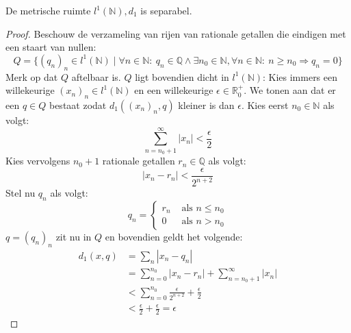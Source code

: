 \documentclass[main.tex]{subfiles}
\begin{document}
\begin{vb}
  De metrische ruimte $l^{1}(\mathbb{N}),d_{1}$ is separabel.
  
  \begin{proof}
    Beschouw de verzameling van rijen van rationale getallen die eindigen met een staart van nullen:\\
    \[ Q = \{ (q_{n})_{n} \in l^{1}(\mathbb{N}) \mid \forall n\in \mathbb{N}:\ q_{n}\in \mathbb{Q} \wedge \exists n_{0}\in \mathbb{N}, \forall n\in \mathbb{N}:\ n \ge n_{0} \Rightarrow q_{n} = 0 \} \]
    Merk op dat $Q$ aftelbaar is.
    $Q$ ligt bovendien dicht in $l^{1}(\mathbb{N})$:
    Kies immers een willekeurige $(x_{n})_{n}\in l^{1}(\mathbb{N})$ en een willekeurige $\epsilon \in \mathbb{R}_{0}^{+}$.
    We tonen aan dat er een $q\in Q$ bestaat zodat $d_{1}((x_{n})_{n},q)$ kleiner is dan $\epsilon$.
    Kies eerst $n_{0}\in \mathbb{N}$ als volgt:
    \[ \sum_{n=n_{0}+1}^{\infty}|x_{n}| < \frac{\epsilon}{2} \]
    Kies vervolgens $n_{0}+1$ rationale getallen $r_{n}\in \mathbb{Q}$ als volgt:
    \[ |x_{n}-r_{n}| < \frac{\epsilon}{2^{n+2}} \]
    Stel nu $q_{n}$ als volgt:
    \[
    q_{n} =
    \begin{cases}
      r_{n} &\text{ als } n \le n_{0}\\
      0 &\text{ als } n > n_{0}
    \end{cases}
    \]
    $q=(q_{n})_{n}$ zit nu in $Q$ en bovendien geldt het volgende:
    \begin{align*}
      d_{1}(x,q)
      &= \sum_{n}|x_{n}-q_{n}|\\
      &= \sum_{n=0}^{n_{0}}|x_{n}-r_{n}| + \sum_{n=n_{0}+1}^{\infty}|x_{n}|\\
      &< \sum_{n=0}^{n_{0}}\frac{\epsilon}{2^{n+2}} + \frac{\epsilon}{2}\\
      &< \frac{\epsilon}{2} + \frac{\epsilon}{2} = \epsilon
    \end{align*}
  \end{proof}
\end{vb}
\end{document}
